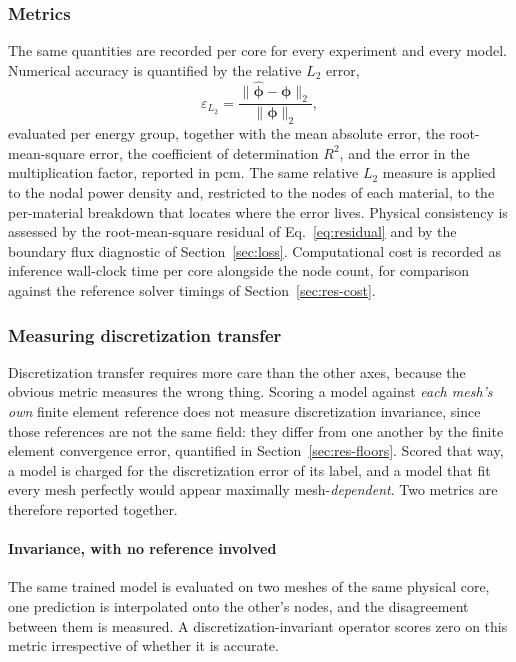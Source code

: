 \documentclass[preprint,12pt]{elsarticle}
\begin{document}
\subsubsection{Metrics}
\label{sec:metrics}

The same quantities are recorded per core for every experiment and every model.
Numerical accuracy is quantified by the relative $L_2$ error,
\begin{equation}
\varepsilon_{L_2} =
\frac{\lVert \hat{\boldsymbol{\phi}} - \boldsymbol{\phi} \rVert_2}
     {\lVert \boldsymbol{\phi} \rVert_2},
\label{eq:l2}
\end{equation}
evaluated per energy group, together with the mean absolute error, the
root-mean-square error, the coefficient of determination $R^2$, and the error
in the multiplication factor, reported in pcm. The same relative $L_2$ measure
is applied to the nodal power density and, restricted to the nodes of each
material, to the per-material breakdown that locates where the error lives.
Physical consistency is assessed by the root-mean-square residual of
Eq.~\eqref{eq:residual} and by the boundary flux diagnostic of
Section~\ref{sec:loss}. Computational cost is recorded as inference wall-clock
time per core alongside the node count, for comparison against the reference
solver timings of Section~\ref{sec:res-cost}.

\subsubsection{Measuring discretization transfer}
\label{sec:res-transfer-metric}

Discretization transfer requires more care than the other axes, because the
obvious metric measures the wrong thing. Scoring a model against \emph{each
mesh's own} finite element reference does not measure discretization
invariance, since those references are not the same field: they differ from one
another by the finite element convergence error, quantified in
Section~\ref{sec:res-floors}. Scored that way, a model is charged for the
discretization error of its label, and a model that fit every mesh perfectly
would appear maximally mesh-\emph{dependent}. Two metrics are therefore
reported together.

\paragraph{Invariance, with no reference involved} The same trained model is
evaluated on two meshes of the same physical core, one prediction is
interpolated onto the other's nodes, and the disagreement between them is
measured. A discretization-invariant operator scores zero on this metric
irrespective of whether it is accurate.
\end{document}
